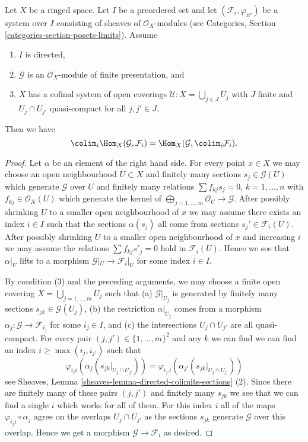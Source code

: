 \begin{lemma}
\label{lemma-finite-presentation-quasi-compact-colimit}
Let $X$ be a ringed space.
Let $I$ be a preordered set and
let $(\mathcal{F}_i, \varphi_{ii'})$ be a system over $I$
consisting of sheaves of $\mathcal{O}_X$-modules
(see Categories, Section \ref{categories-section-posets-limits}).
Assume
\begin{enumerate}
\item $I$ is directed,
\item $\mathcal{G}$ is an $\mathcal{O}_X$-module of finite presentation, and
\item $X$ has a cofinal system of open coverings
$\mathcal{U} : X = \bigcup_{j\in J} U_j$ with
$J$ finite and $U_j \cap U_{j'}$ quasi-compact
for all $j, j' \in J$.
\end{enumerate}
Then we have
$$
\colim_i \Hom_X(\mathcal{G}, \mathcal{F}_i)
=
\Hom_X(\mathcal{G}, \colim_i \mathcal{F}_i).
$$
\end{lemma}

\begin{proof}
Let $\alpha$ be an element of the right hand side.
For every point $x \in X$ we may choose an open neighbourhood
$U \subset X$ and finitely many sections
$s_j \in \mathcal{G}(U)$ which generate $\mathcal{G}$ over $U$
and finitely many relations $\sum f_{kj} s_j = 0$, $k = 1, \ldots, n$
with $f_{kj} \in \mathcal{O}_X(U)$ which generate the kernel
of $\bigoplus_{j = 1, \ldots, m} \mathcal{O}_U \to \mathcal{G}$.
After possibly shrinking $U$ to a smaller open neighbourhood of $x$
we may assume there exists an index $i \in I$ such that
the sections $\alpha(s_j)$ all come from sections
$s_j' \in \mathcal{F}_i(U)$.
After possibly shrinking $U$ to a smaller open neighbourhood of $x$
and increasing $i$ we may assume the relations
$\sum f_{kj} s'_j = 0$ hold in $\mathcal{F}_i(U)$.
Hence we see that $\alpha|_U$ lifts to a morphism
$\mathcal{G}|_U \to \mathcal{F}_i|_U$ for some index $i \in I$.

\medskip\noindent
By condition (3) and the preceding arguments, we may choose
a finite open covering $X = \bigcup_{j = 1, \ldots, m} U_j$
such that (a) $\mathcal{G}|_{U_j}$ is generated by finitely
many sections $s_{jk} \in \mathcal{G}(U_j)$, (b) the restriction
$\alpha|_{U_j}$ comes from a morphism
$\alpha_j : \mathcal{G} \to \mathcal{F}_{i_j}$
for some $i_j \in I$, and (c) the intersections
$U_j \cap U_{j'}$ are all quasi-compact.
For every pair $(j, j') \in \{1, \ldots, m\}^2$
and any $k$ we can find
we can find an index $i \geq \max(i_j, i_{j'})$ such
that
$$
\varphi_{i_ji}(\alpha_j(s_{jk}|_{U_j \cap U_{j'}})) =
\varphi_{i_{j'}i}(\alpha_{j'}(s_{jk}|_{U_j \cap U_{j'}}))
$$
see Sheaves, Lemma \ref{sheaves-lemma-directed-colimits-sections} (2).
Since there are finitely many of these pairs $(j, j')$ and
finitely many $s_{jk}$ we see that we can find a single $i$
which works for all of them. For this index $i$ all of the maps
$\varphi_{i_ji} \circ \alpha_j$ agree on the overlaps $U_j \cap U_{j'}$
as the sections $s_{jk}$ generate $\mathcal{G}$ over this overlap.
Hence we get a morphism $\mathcal{G} \to \mathcal{F}_i$ as desired.
\end{proof}

